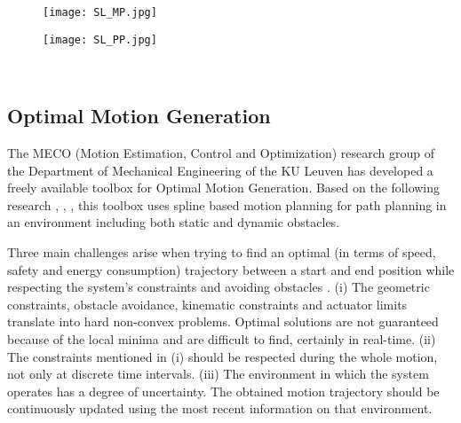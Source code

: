 \begin{figure}[!tbp]
\centering
 \begin{minipage}[b]{.45\linewidth}
		\centering
		\texttt{[image: SL\_MP.jpg]}
 \end{minipage}
 \hfill%
 \centering
 \begin{minipage}[b]{.45\linewidth}
	\centering
	 \texttt{[image: SL\_PP.jpg]}
 \end{minipage}\\[-7pt]
 \begin{minipage}[t]{.45\linewidth}
 \end{minipage}
 \hfill
 \begin{minipage}[t]{.45\linewidth}
 \end{minipage}
\end{figure}

\newpage

\subsection{Optimal Motion Generation} \label{sec:OMGreview}
The MECO (Motion Estimation, Control and Optimization) research group of the Department of Mechanical Engineering of the KU Leuven has developed a freely available toolbox \cite{MercyVanParys2017} for Optimal Motion Generation. Based on the following research \cite{MercyEtAl2016}, \cite{VanParysPipeleers2016}, \cite{VanParysPipeleers2017}, this toolbox uses spline based motion planning for path planning in an environment including both static and dynamic obstacles. 

Three main challenges arise when trying to find an optimal (in terms of speed, safety and energy consumption) trajectory between a start and end position while respecting the system's constraints and avoiding obstacles \cite{MercyEtAl2016}.
(i) The geometric constraints, obstacle avoidance, kinematic constraints and actuator limits translate into hard non-convex problems. Optimal solutions are not guaranteed because of the local minima and are difficult to find, certainly in real-time. 
(ii) The constraints mentioned in (i) should be respected during the whole motion, not only at discrete time intervals. 
(iii) The environment in which the system operates has a degree of uncertainty. The obtained motion trajectory should be continuously updated using the most recent information on that environment.

